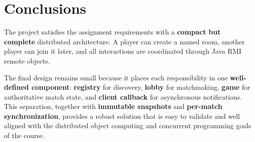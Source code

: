 \clearpage
\section{Conclusions}

The project satisfies the assignment requirements with a \textbf{compact but
complete} distributed architecture. A player can create a named room, another
player can join it later, and all interactions are coordinated through Java RMI
remote objects.

The final design remains small because it places each responsibility in one
\textbf{well-defined component}: \textbf{registry} for discovery,
\textbf{lobby} for matchmaking, \textbf{game} for authoritative match state,
and \textbf{client callback} for asynchronous notifications. This separation,
together with \textbf{immutable snapshots} and \textbf{per-match
synchronization}, provides a robust solution that is easy to validate and well
aligned with the distributed object computing and concurrent programming goals
of the course.
